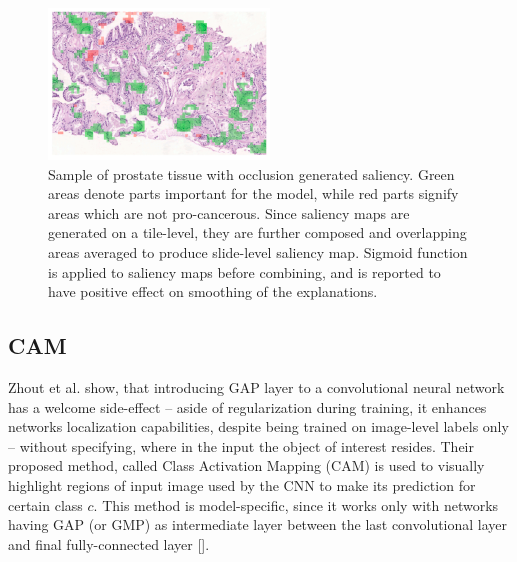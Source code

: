 \begin{figure}[!h]
    \begin{center}
    \begin{minipage}{1\textwidth}
      \includegraphics[width=\textwidth]{img/occ-saliency.png}
    \end{minipage}
    \caption{Sample of prostate tissue with occlusion generated saliency. Green areas denote parts important for the model, while red parts signify areas which are not pro-cancerous. Since saliency maps are generated on a tile-level, they are further composed and overlapping areas averaged to produce slide-level saliency map. Sigmoid function is applied to saliency maps before combining, and is reported to have positive effect on smoothing of the explanations.}
    \label{fig:occ-saliency}
    \end{center}
\end{figure}


\subsection{CAM}

Zhout et al. show, that introducing GAP layer to a convolutional neural network has a welcome side-effect -- aside of regularization during training, it enhances networks localization capabilities, despite being trained on image-level labels only -- without specifying, where in the input the object of interest resides. Their proposed method, called Class Activation Mapping (CAM) is used to visually highlight regions of input image used by the CNN to make its prediction for certain class $c$. This method is model-specific, since it works only with networks having GAP (or GMP) as intermediate layer between the last convolutional layer and final fully-connected layer []. 

